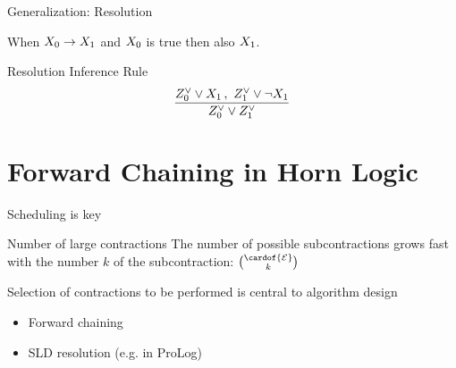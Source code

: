 \documentclass{beamer}
\begin{document}
    \begin{frame}{Generalization: Resolution}

        When $X_{0}\rightarrow X_{1}$ and $X_{0}$ is true then also $X_{1}$.

        \begin{block}{Resolution Inference Rule}
            \begin{align*}
                \frac{
                    Z^{\lor}_{0}{} \lor X_{1} \,,\,\, Z^{\lor}_{1}{} \lor \lnot X_{1}
                }{
                    Z^{\lor}_{0}{} \lor Z^{\lor}_{1}{}
                }
            \end{align*}
        \end{block}


    \end{frame}


    \section{Forward Chaining in Horn Logic}


    \begin{frame}{Scheduling is key}

        \begin{block}{Number of large contractions}
            The number of possible subcontractions grows fast with the number $k$ of the subcontraction: $\binom{\cardof{\edges}}{k}$
        \end{block}

        Selection of contractions to be performed is central to algorithm design
        \begin{itemize}
            \item Forward chaining
            \item SLD resolution (e.g. in ProLog)
        \end{itemize}

    \end{frame}
\end{document}
